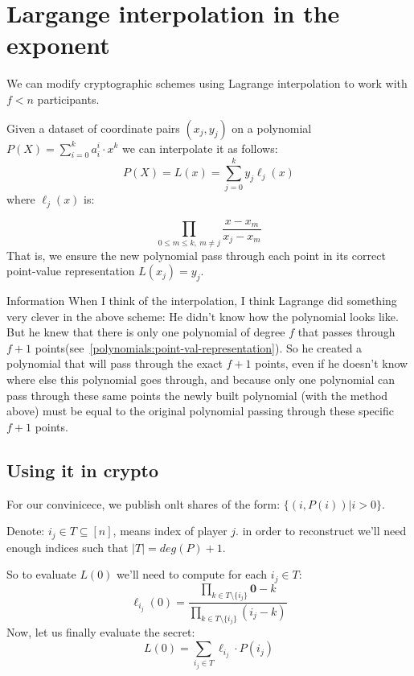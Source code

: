 \section{Largange interpolation in the exponent}\label{lagrange-in-exponent} %
We can modify cryptographic schemes using Lagrange interpolation to work with $f<n$ participants.

Given a dataset of coordinate pairs $(x_j,y_j)$ on 
a polynomial $P(X)=\sum_{i=0}^{k}{a_i^{i}\cdot x^k}$ we can interpolate it as follows:
 $$P(X)=L(x)=\sum _{j=0}^{k}y_{j}\ell _{j}(x)$$
 where $\ell _{j}(x)$ is:

 $$\prod_{0\leq m\leq k, \ m\neq j}\frac {x-x_{m}}{x_{j}-x_{m}}$$
That is, we ensure the new polynomial pass through each point in its correct point-value representation $L(x_j)=y_j$.


\begin{bclogo}[logo=\bcinfo, couleurBarre=orange, noborder=true, couleur=white]{Information}
When I think of the interpolation, I think Lagrange did something very clever in the above scheme:
He didn't know how the polynomial looks like.
But he knew that there is only one polynomial of degree $f$ that passes
through $f+1$ points(see~\ref{polynomials:point-val-representation}).
So he created a polynomial that will pass through the exact $f+1$ points, even if he doesn't know 
where else this polynomial goes through, and because only one polynomial can pass through these same points
the newly built polynomial (with the method above) must be equal to the original polynomial
passing through these specific $f+1$ points.
\end{bclogo}



\subsection{Using it in crypto}
For our convinicece, we publish onlt shares of the form: $\{(i,P(i))| i > 0\}$.

Denote: $i_j\in T\subseteq [n]$,  means index of player $j$.
in order to reconstruct we'll need enough indices such that $|T|=deg(P)+1$.

So to evaluate $L(0)$ we'll need to compute for each $i_j\in T$:
$$
 \ell_{i_j}(0) = \frac{
 \prod _{k\in T \setminus \{i_j\}}{\textbf{0}-k}
}{
  \prod_{k\in T \setminus \{i_j\}}{ (i_j - k)}
}
$$
Now, let us finally evaluate the secret:
$$ L(0) = \sum_{i_j \in T} {\ell_{i_j}\cdot P(i_j)} $$


